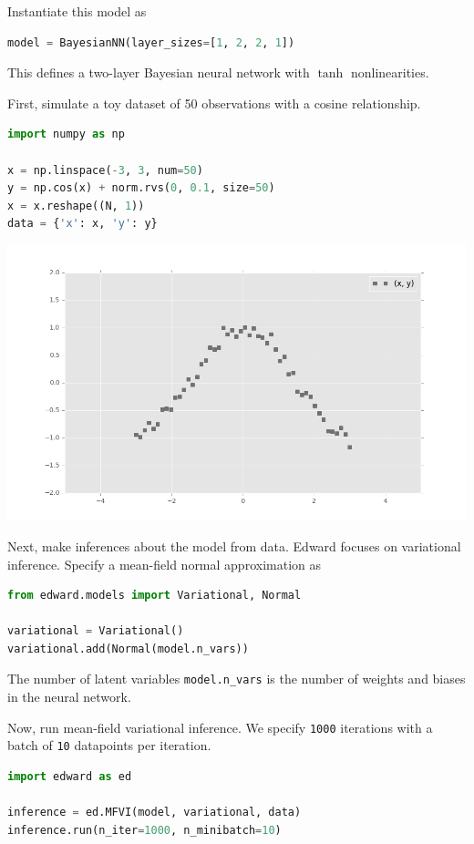 Instantiate this model as
\begin{lstlisting}[language=Python]
model = BayesianNN(layer_sizes=[1, 2, 2, 1])
\end{lstlisting}
This defines a two-layer Bayesian neural network with $\tanh$
nonlinearities.

First, simulate a toy dataset of 50 observations with a cosine relationship.
\begin{lstlisting}[language=Python]
import numpy as np

x = np.linspace(-3, 3, num=50)
y = np.cos(x) + norm.rvs(0, 0.1, size=50)
x = x.reshape((N, 1))
data = {'x': x, 'y': y}
\end{lstlisting}
\includegraphics[width=700px]{images/getting-started-fig0.png}

Next, make inferences about the model from data.
Edward focuses on variational inference. Specify a mean-field normal
approximation as
\begin{lstlisting}[language=Python]
from edward.models import Variational, Normal

variational = Variational()
variational.add(Normal(model.n_vars))
\end{lstlisting}
The number of latent variables \texttt{model.n_vars} is the number
of weights and biases in the neural network.

Now, run mean-field variational inference. We specify \texttt{1000} iterations
with a batch of \texttt{10} datapoints per iteration.
\begin{lstlisting}[language=Python]
import edward as ed

inference = ed.MFVI(model, variational, data)
inference.run(n_iter=1000, n_minibatch=10)
\end{lstlisting}


